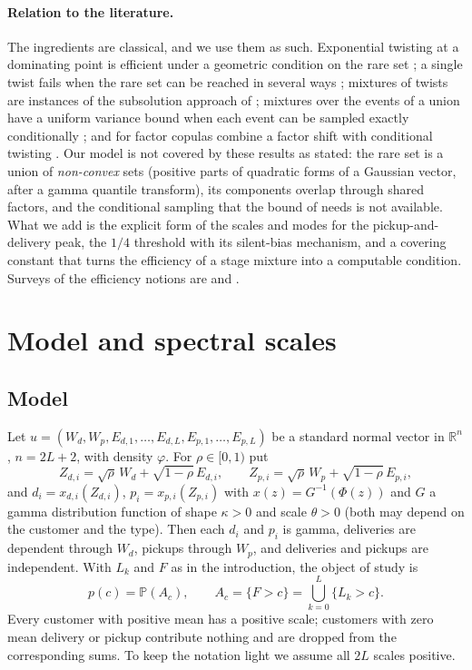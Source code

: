\documentclass[pdflatex,sn-mathphys-ay]{sn-jnl}%
\theoremstyle{thmstyleone}%
\theoremstyle{thmstylethree}%
\theoremstyle{thmstyletwo}%
\renewcommand{\P}{\mathbb{P}}
\newcommand{\R}{\mathbb{R}}
\begin{document}
\paragraph{Relation to the literature.}
The ingredients are classical, and we use them as such. Exponential twisting at a
dominating point is efficient under a geometric condition on the rare set
\citep{SadowskyBucklew1990,Bucklew2004}; a single twist fails when the rare set can be
reached in several ways \citep{GlassermanWang1997}; mixtures of twists are instances of
the subsolution approach of \citet{DupuisWang2007}; mixtures over the events of a union
have a uniform variance bound when each event can be sampled exactly conditionally
\citep{OwenMaximovChertkov2019}; and for factor copulas \citet{GlassermanLi2005} combine a
factor shift with conditional twisting \citep[see also][]{BassambooJunejaZeevi2008}. Our
model is not covered by these results as stated: the rare set is a union of
\emph{non-convex} sets (positive parts of quadratic forms of a Gaussian vector, after a
gamma quantile transform), its components overlap through shared factors, and the
conditional sampling that the bound of \citeauthor{OwenMaximovChertkov2019} needs is not
available. What we add is the explicit form of the scales and modes for the
pickup-and-delivery peak, the $1/4$ threshold with its silent-bias mechanism, and a
covering constant that turns the efficiency of a stage mixture into a computable
condition. Surveys of the efficiency notions are \citet{AsmussenGlynn2007} and
\citet{Bucklew2004}.

\section{Model and spectral scales}
\label{sec:model}

\subsection{Model}
Let $u=(W_d,W_p,E_{d,1},\dots,E_{d,L},E_{p,1},\dots,E_{p,L})$ be a standard normal vector
in $\R^n$, $n=2L+2$, with density $\varphi$. For $\rho\in[0,1)$ put
\[
Z_{d,i}=\sqrt\rho\,W_d+\sqrt{1-\rho}\,E_{d,i},\qquad Z_{p,i}=\sqrt\rho\,W_p+\sqrt{1-\rho}\,E_{p,i},
\]
and $d_i=x_{d,i}(Z_{d,i})$, $p_i=x_{p,i}(Z_{p,i})$ with $x(z)=G^{-1}(\Phi(z))$ and $G$ a
gamma distribution function of shape $\kappa>0$ and scale $\theta>0$ (both may depend on
the customer and the type). Then each $d_i$ and $p_i$ is gamma, deliveries are
dependent through $W_d$, pickups through $W_p$, and deliveries and pickups are
independent. With $L_k$ and $F$ as in the introduction, the object of study is
\[
p(c)=\P(A_c),\qquad A_c=\{F>c\}=\bigcup_{k=0}^L\{L_k>c\}.
\]
Every customer with positive mean has a positive scale; customers with zero mean
delivery or pickup contribute nothing and are dropped from the corresponding sums.
To keep the notation light we assume all $2L$ scales positive.
\end{document}
